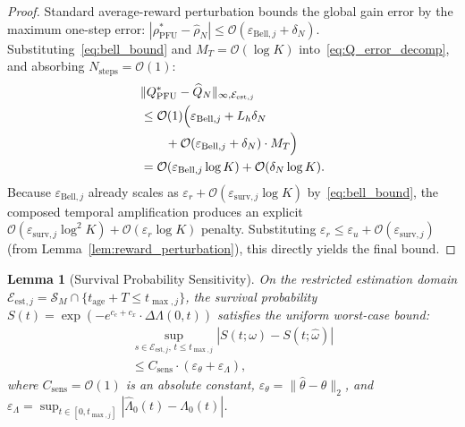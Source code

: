 \documentclass[letterpaper, 10 pt, conference]{IEEEconf}
\newtheorem{lemma}{Lemma}
\newcommand{\what}[1]{\widehat{#1}}
\begin{document}
\begin{proof}
    Standard average-reward perturbation bounds the global gain error by the maximum one-step error: $|\rho^*_{\mathrm{PFU}} - \what{\rho}_N| \le \mathcal{O}(\varepsilon_{\mathrm{Bell},j} + \delta_N)$. Substituting~\eqref{eq:bell_bound} and $M_T = \mathcal{O}(\log K)$ into~\eqref{eq:Q_error_decomp}, and absorbing $N_{\mathrm{steps}} = \mathcal{O}(1)$:
    \begin{align}
        &\|Q^*_{\mathrm{PFU}} - \what{Q}_N\|_{\infty, \mathcal{E}_{\mathrm{est},j}} \notag \\
        &\leq \mathcal{O}(1)\Big(\varepsilon_{\mathrm{Bell},j} + L_h \delta_N \notag \\
        &\qquad + \mathcal{O}(\varepsilon_{\mathrm{Bell},j} + \delta_N) \cdot M_T\Big) \notag \\
        &= \mathcal{O}(\varepsilon_{\mathrm{Bell},j} \log K) + \mathcal{O}(\delta_N \log K). \label{eq:Q_error_final}
    \end{align}
    Because $\varepsilon_{\mathrm{Bell},j}$ already scales as $\varepsilon_r + \mathcal{O}(\varepsilon_{\mathrm{surv},j} \log K)$ by~\eqref{eq:bell_bound}, the composed temporal amplification produces an explicit $\mathcal{O}(\varepsilon_{\mathrm{surv},j} \log^2 K) + \mathcal{O}(\varepsilon_r \log K)$ penalty. Substituting $\varepsilon_r \le \varepsilon_u + \mathcal{O}(\varepsilon_{\mathrm{surv},j})$ (from Lemma~\ref{lem:reward_perturbation}), this directly yields the final bound.
\end{proof}

\begin{lemma}[Survival Probability Sensitivity]
    \label{lem:pointwise_sensitivity}
    On the restricted estimation domain $\mathcal{E}_{\mathrm{est},j} = \mathcal{S}_M \cap \{t_{\mathrm{age}} + T \le t_{\max,j}\}$, the survival probability $S(t) = \exp(-e^{c_c+c_x} \cdot \Delta\Lambda(0,t))$ satisfies the uniform worst-case bound:
    \begin{multline}
        \label{eq:pfail_linf}
        \sup_{s \in \mathcal{E}_{\mathrm{est},j},\, t \le t_{\max,j}} |S(t; \omega) - S(t; \what{\omega})| \\
        \leq C_{\mathrm{sens}} \cdot (\varepsilon_\theta + \varepsilon_\Lambda),
    \end{multline}
    where $C_{\mathrm{sens}} = \mathcal{O}(1)$ is an absolute constant, $\varepsilon_\theta = \|\what{\theta} - \theta\|_2$, and $\varepsilon_\Lambda = \sup_{t \in [0, t_{\max,j}]} |\what{\Lambda}_0(t) - \Lambda_0(t)|$.
\end{lemma}
\end{document}
